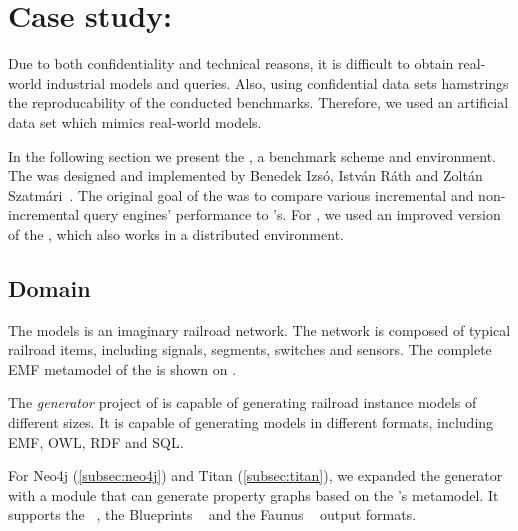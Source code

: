 \section{Case study: \tb{}}
\label{sec:trainbenchmark}

Due to both confidentiality and technical reasons, it is difficult to obtain real-world industrial models and queries. Also, using confidential data sets hamstrings the reproducability of the conducted benchmarks. Therefore, we used an artificial data set which mimics real-world models.  

In the following section we present the \textit{\tb{}}, a benchmark scheme and environment. The \tb{} was designed and implemented by Benedek Izsó, István Ráth and Zoltán Szatmári~\cite{Izso:2012:ODD:2428516.2428523}. The original goal of the \tb{} was to compare various incremental and non-incremental query engines' performance to \eiq{}'s. For \iqd{}, we used an improved version of the \tb{}, which also works in a distributed environment.

\subsection{Domain}


The \tb{} models is an imaginary railroad network. The network is composed of typical railroad items, including signals, segments, switches and sensors. The complete EMF metamodel of the \tb{} is shown on . 

The \textit{generator} project of \tb{} is capable of generating railroad instance models of different sizes. It is capable of generating models in different formats, including EMF, OWL, RDF and SQL. 

For Neo4j (\autoref{subsec:neo4j}) and Titan (\autoref{subsec:titan}), we expanded the generator with a module that can generate property graphs based on the \tb{}'s metamodel. It supports the \graphml{}~\cite{GraphML}, the Blueprints \graphson{}~\cite{BlueprintsGraphSON} and the Faunus \graphson{}~\cite{FaunusGraphSON} output formats.


